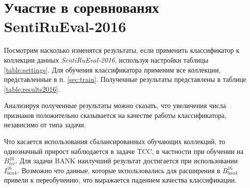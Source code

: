 \section{Участие в соревнованях SentiRuEval-2016}

Посмотрим насколько изменятся результаты, если применить классификатор к
коллекции данных {\it SentiRuEval-2016}, используя настройки таблицы
\ref{table:settings}.
Для обучения классификатора применим все коллекции, представленные в
п. \ref{sec:train}.
Полученные результаты представлены в таблице \ref{table:results2016}.



Анализируя полученные результаты можно сказать, что увеличения числа признаков
положительно сказывается на качестве работы классификатора, независимо от
типа задачи.

Что касается использования сбалансированных обучающих коллекций, то
однозначный прирост наблюдается в задаче TCC, в частности при обучении на
$B_{tcc}^{16}$.
Для задачи BANK наилучший результат достигается при использовании $I_{bank}^{16}$.
Возможно что данные, которые использовались для расширения в $B_{bank}^{16}$
привели к переобучению, что выражается падением качества классификации.

